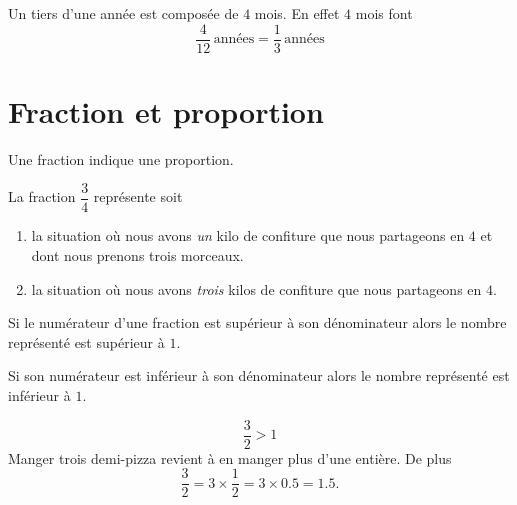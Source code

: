 \begin{example}
    Un tiers d'une année est composée de \( 4\) mois. En effet \( 4\) mois font
    \begin{equation}
        \frac{ 4 }{ 12 }\,\text{années}=\frac{ 1 }{ 3 }\,\text{années}
    \end{equation}
\end{example}

\section{Fraction et proportion}

\begin{Aretenir}
    Une fraction indique une proportion. 
\end{Aretenir}

\begin{example}
    La fraction \( \dfrac{ 3 }{ 4 }\) représente soit
    \begin{enumerate}
        \item
            la situation où nous avons \emph{un} kilo de confiture que nous partageons en \( 4\) et dont nous prenons trois morceaux.
        \item
            la situation où nous avons \emph{trois} kilos de confiture que nous partageons en \( 4\).
    \end{enumerate}
\end{example}

\begin{Aretenir}
Si le numérateur d'une fraction est supérieur à son dénominateur alors le nombre représenté est supérieur à $1$.

Si son numérateur est inférieur à son dénominateur alors le nombre représenté est inférieur à $1$.
\end{Aretenir}

\begin{example}
    \begin{equation}
        \frac{ 3 }{ 2 }>1
    \end{equation}
    Manger trois demi-pizza revient à en manger plus d'une entière. De plus
    \begin{equation}
        \frac{ 3 }{ 2 }=3\times \frac{ 1 }{2}=3\times 0.5=1.5.
    \end{equation}
\end{example}

